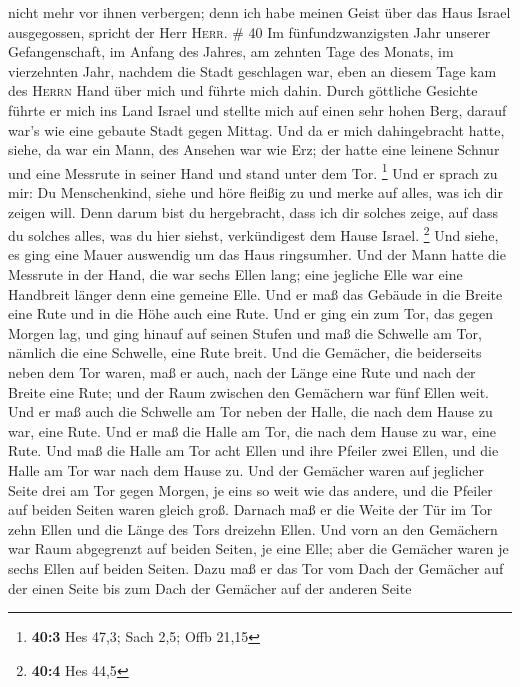 nicht mehr vor ihnen verbergen; denn ich habe meinen Geist über das Haus
Israel ausgegossen, spricht der Herr \textsc{Herr}. \# 40 
Im fünfundzwanzigsten Jahr unserer Gefangenschaft, im Anfang des Jahres,
am zehnten Tage des Monats, im vierzehnten Jahr, nachdem die Stadt
geschlagen war, eben an diesem Tage kam des \textsc{Herrn} Hand über
mich und führte mich dahin.  Durch göttliche Gesichte
führte er mich ins Land Israel und stellte mich auf einen sehr hohen
Berg, darauf war's wie eine gebaute Stadt gegen Mittag. 
Und da er mich dahingebracht hatte, siehe, da war ein Mann, des Ansehen
war wie Erz; der hatte eine leinene Schnur und eine Messrute in seiner
Hand und stand unter dem Tor. \footnote{\textbf{40:3} Hes 47,3; Sach
  2,5; Offb 21,15}  Und er sprach zu mir: Du Menschenkind,
siehe und höre fleißig zu und merke auf alles, was ich dir zeigen will.
Denn darum bist du hergebracht, dass ich dir solches zeige, auf dass du
solches alles, was du hier siehst, verkündigest dem Hause Israel.
\footnote{\textbf{40:4} Hes 44,5}  Und siehe, es ging eine
Mauer auswendig um das Haus ringsumher. Und der Mann hatte die Messrute
in der Hand, die war sechs Ellen lang; eine jegliche Elle war eine
Handbreit länger denn eine gemeine Elle. Und er maß das Gebäude in die
Breite eine Rute und in die Höhe auch eine Rute.  Und er
ging ein zum Tor, das gegen Morgen lag, und ging hinauf auf seinen
Stufen und maß die Schwelle am Tor, nämlich die eine Schwelle, eine Rute
breit.  Und die Gemächer, die beiderseits neben dem Tor
waren, maß er auch, nach der Länge eine Rute und nach der Breite eine
Rute; und der Raum zwischen den Gemächern war fünf Ellen weit. Und er
maß auch die Schwelle am Tor neben der Halle, die nach dem Hause zu war,
eine Rute.  Und er maß die Halle am Tor, die nach dem
Hause zu war, eine Rute.  Und maß die Halle am Tor acht
Ellen und ihre Pfeiler zwei Ellen, und die Halle am Tor war nach dem
Hause zu.  Und der Gemächer waren auf jeglicher Seite
drei am Tor gegen Morgen, je eins so weit wie das andere, und die
Pfeiler auf beiden Seiten waren gleich groß.  Darnach maß
er die Weite der Tür im Tor zehn Ellen und die Länge des Tors dreizehn
Ellen.  Und vorn an den Gemächern war Raum abgegrenzt auf
beiden Seiten, je eine Elle; aber die Gemächer waren je sechs Ellen auf
beiden Seiten.  Dazu maß er das Tor vom Dach der Gemächer
auf der einen Seite bis zum Dach der Gemächer auf der anderen Seite
